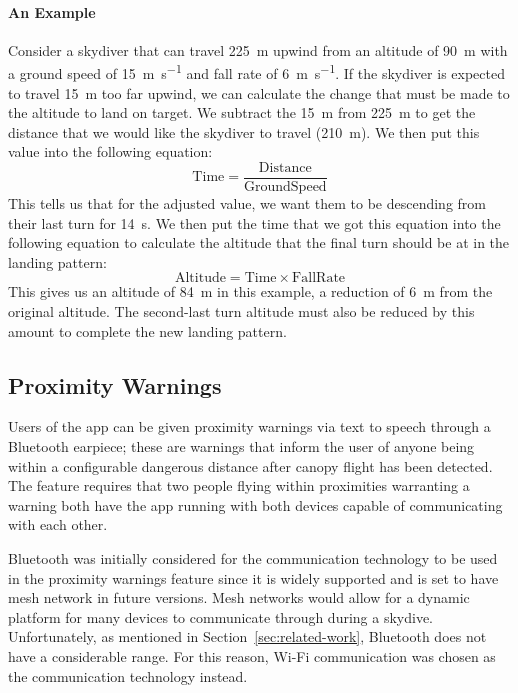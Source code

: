 \paragraph{An Example}
Consider a skydiver that can travel \SI{225}{\metre} upwind from an altitude of \SI{90}{\metre} with a ground speed of \SI{15}{\metre\per\second} and fall rate of \SI{6}{\metre\per\second}. If the skydiver is expected to travel \SI{15}{\metre} too far upwind, we can calculate the change that must be made to the altitude to land on target. We subtract the \SI{15}{\metre} from \SI{225}{\metre} to get the distance that we would like the skydiver to travel (\SI{210}{\metre}). We then put this value into the following equation:
\begin{equation}
  \mathrm{Time} = \frac{\mathrm{Distance}}{\mathrm{Ground Speed}}
\end{equation}
This tells us that for the adjusted value, we want them to be descending from their last turn for
\SI{14}{\second}.
We then put the time that we got this equation into the following equation to calculate the altitude that the final turn should be at in the landing pattern:
\begin{equation}
  \mathrm{Altitude} = \mathrm{Time} \times \mathrm{Fall Rate}
\end{equation}
This gives us an altitude of \SI{84}{\metre} in this example, a reduction of \SI{6}{\metre} from the original altitude. The second-last turn altitude must also be reduced by this amount to complete the new landing pattern.

\subsection{Proximity Warnings}
Users of the app can be given proximity warnings via text to speech through a Bluetooth earpiece; these are warnings that inform the user of anyone being within a configurable dangerous distance after canopy flight has been detected.
The feature requires that two people flying within proximities warranting a warning both have the app running with both devices capable of communicating with each other.

Bluetooth was initially considered for the communication technology to be used in the proximity warnings feature since it is widely supported and is set to have mesh network in future versions. Mesh networks would allow for a dynamic platform for many devices to communicate through during a skydive. Unfortunately, as mentioned in Section~\ref{sec:related-work}, Bluetooth does not have a considerable range. For this reason, Wi-Fi communication was chosen as the communication technology instead.

